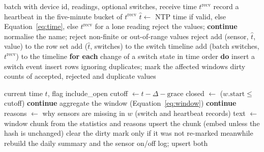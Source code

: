 \begin{algorithm}[H]
\caption{Ingest a telemetry batch}
\label{alg:ingest}
\begin{algorithmic}[1]
\Require batch with device id, readings, optional switches, receive time $t^{\mathrm{recv}}$
\State record a heartbeat in the five-minute bucket of $t^{\mathrm{recv}}$
  \State $\hat t \gets$ NTP time if valid, else Equation~\ref{eq:time}, else $t^{\mathrm{recv}}$ for a lone reading
   \State reject the values; \textbf{continue} \EndIf
    \State normalise the name; reject non-finite or out-of-range values
     \State reject \EndIf
    \State add (sensor, $\hat t$, value) to the row set
  \EndFor
   \State add ($\hat t$, switches) to the switch timeline \EndIf
\EndFor
\State add (batch switches, $t^{\mathrm{recv}}$) to the timeline
\State \textbf{for each} change of a switch state in time order \textbf{do} insert a switch event
\State insert rows ignoring duplicates; mark the affected windows dirty
\State \Return counts of accepted, rejected and duplicate values
\end{algorithmic}
\end{algorithm}

\begin{algorithm}[H]
\caption{Sync: aggregate, write and embed windows}
\label{alg:sync}
\begin{algorithmic}[1]
\Require current time $t$, flag include\_open
\State cutoff $\gets t-\Delta-\text{grace}$
  \State closed $\gets$ ($w.\mathrm{start}\le$ cutoff)
   \State \textbf{continue} \EndIf
  \State aggregate the window (Equation~\ref{eq:window})
   \State \textbf{continue} \EndIf
  \State reasons $\gets$ why sensors are missing in $w$ (switch and heartbeat records)
  \State text $\gets$ window chunk from the statistics and reasons
  \State upsert the chunk (embed unless the hash is unchanged)
  \State clear the dirty mark only if it was not re-marked meanwhile
\EndFor
{}
  \State rebuild the daily summary and the sensor on/off log; upsert both
\EndFor
\end{algorithmic}
\end{algorithm}

